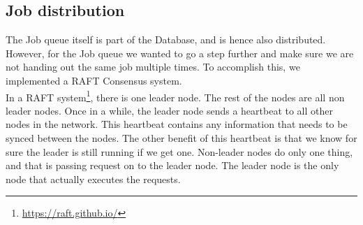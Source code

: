 \documentclass[../Main.tex]{subfiles}
\begin{document}
\subsection{Job distribution}
The Job queue itself is part of the Database, and is hence also distributed. However, for the Job queue we wanted to go a step further and make sure we are not handing out the same job multiple times. To accomplish this, we implemented a RAFT Consensus system.\\

In a RAFT system\footnote{\url{https://raft.github.io/}},
there is one leader node. The rest of the nodes are all non leader nodes. Once in a while, the leader node sends a heartbeat to all other nodes in the network. This heartbeat contains any information that needs to be synced between the nodes. The other benefit of this heartbeat is that we know for sure the leader is still running if we get one. Non-leader nodes do only one thing, and that is passing request on to the leader node. The leader node is the only node that actually executes the requests.\\ 
\end{document}
